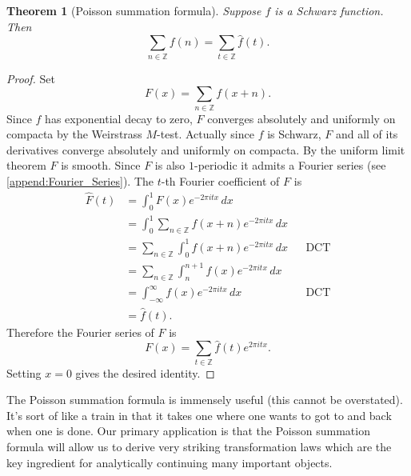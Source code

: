 \documentclass[12pt]{book}
\newtheorem{theorem}{Theorem}[section]
\theoremstyle{definition}\newframedtheorem{method}{Method}
\newcommand{\Z}{\mathbb{Z}}
\newcommand{\<}{\langle}
\renewcommand{\>}{\rangle}
\begin{document}
      \begin{theorem}[Poisson summation formula]
        Suppose $f$ is a Schwarz function. Then
        \[
          \sum_{n \in \Z}f(n) = \sum_{t \in \Z}\hat{f}(t).
        \]
      \end{theorem}
      \begin{proof}
        Set
        \[
          F(x) = \sum_{n \in \Z}f(x+n).
        \]
        Since $f$ has exponential decay to zero, $F$ converges absolutely and uniformly on compacta by the Weirstrass $M$-test. Actually since $f$ is Schwarz, $F$ and all of its derivatives converge absolutely and uniformly on compacta. By the uniform limit theorem $F$ is smooth. Since $F$ is also $1$-periodic it admits a Fourier series (see \cref{append:Fourier_Series}). The $t$-th Fourier coefficient of $F$ is
        \begin{align*}
          \hat{F}(t) &= \int_{0}^{1}F(x)e^{-2\pi itx}\,dx \\
          &= \int_{0}^{1}\sum_{n \in \Z}f(x+n)e^{-2\pi itx}\,dx \\
          &= \sum_{n \in \Z}\int_{0}^{1}f(x+n)e^{-2\pi itx}\,dx && \text{DCT} \\
          &= \sum_{n \in \Z}\int_{n}^{n+1}f(x)e^{-2\pi itx}\,dx \\
          &= \int_{-\infty}^{\infty}f(x)e^{-2\pi itx}\,dx && \text{DCT} \\
          &= \hat{f}(t).
        \end{align*}
        Therefore the Fourier series of $F$ is
        \[
          F(x) = \sum_{t \in \Z}\hat{f}(t)e^{2\pi itx}.
        \]
        Setting $x = 0$ gives the desired identity.
      \end{proof}

      The Poisson summation formula is immensely useful (this cannot be overstated). It's sort of like a train in that it takes one where one wants to got to and back when one is done. Our primary application is that the Poisson summation formula will allow us to derive very striking transformation laws which are the key ingredient for analytically continuing many important objects.
\end{document}
